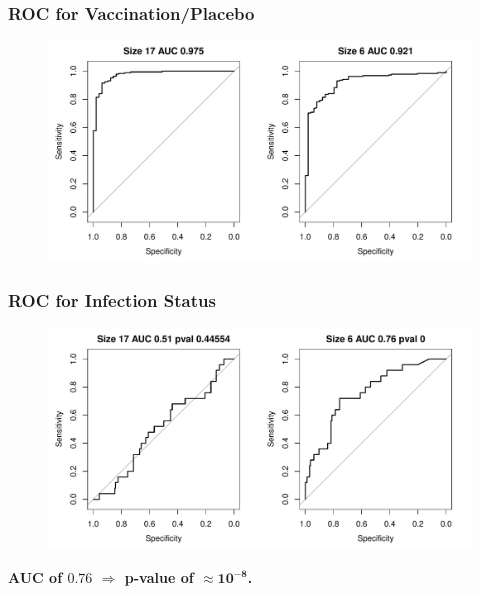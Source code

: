\documentclass{beamer}
\makeatletter
\def\maxwidth{ %
  \ifdim\Gin@nat@width>\linewidth
    \linewidth
  \else
    \Gin@nat@width
  \fi
}
\theoremstyle{definition}
\makeatother
\begin{document}
\begin{frame}
\frametitle{ROC for Vaccination/Placebo}
\begin{figure}[]
\includegraphics[width= \maxwidth]{figures/HVTNcompROCvacc} 
\end{figure}
\end{frame}


\begin{frame}
\frametitle{ROC for Infection Status} 
\begin{figure}[]
\includegraphics[width= \maxwidth]{figures/HVTNcompROCinfect} 
\end{figure}

\textbf{AUC of $\boldsymbol{0.76}$ $\boldsymbol{\Rightarrow}$ p-value of $\boldsymbol{ \approx 10^{-8}}$.}
\end{frame}

\end{document}
